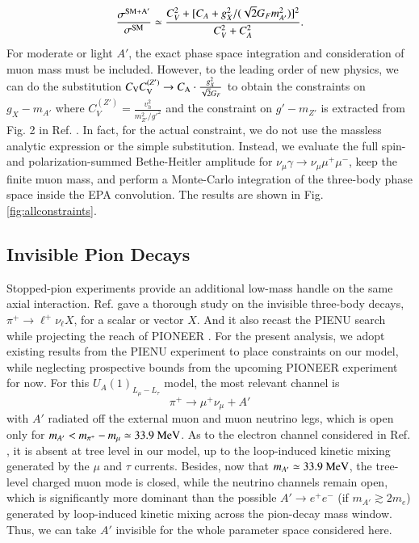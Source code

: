 \documentclass[onecolumn, aps, nofootinbib, prd, preprint, floats, floatfix, amsmath, amssymb, superscriptaddress, preprintnumbers]{revtex4-1}
\begin{document}
\begin{equation}
    \frac{\sigma^{\rm SM+A'}}{\sigma^{\rm SM}}\simeq\frac{C_V^2+[C_A+g_X^2/(\sqrt{2}G_F m_{A'}^2)]^2}{C_V^2+C_A^2}.
\end{equation}
For moderate or light $A'$, the exact phase space integration and consideration of muon mass must be included. However, to the leading order of new physics, we can do the substitution $C_{\rm V} C_{\rm V}^{(Z')}\to C_{\rm A}\cdot \frac{g_X^2}{\sqrt2G_F}$ to obtain the constraints on $g_X-m_{A'}$ where $C_{V}^{(Z')}=\frac{v_h^2}{m_{Z'}^2/g'^2}$ and the constraint on $g'-m_{Z'}$ is extracted from Fig. 2 in Ref. \cite{Altmannshofer:2014pba}.
In fact, for the actual constraint, we do not use the massless analytic expression or the simple substitution. Instead, we evaluate the full spin- and polarization-summed Bethe-Heitler amplitude for $\nu_\mu\gamma\to\nu_\mu\mu^+\mu^-$, keep the finite muon mass, and perform a Monte-Carlo integration of the three-body phase space inside the EPA convolution. The results are shown in Fig. \ref{fig:allconstraints}.

\subsection{Invisible Pion Decays}
\label{subsec:pion-invisible}

Stopped-pion experiments provide an additional low-mass handle on the same axial interaction. Ref. \cite{Altmannshofer:2026opc} gave a thorough study on the invisible three-body decays, $\pi^+\to \ell^+\nu_\ell X$, for a scalar or vector $X$. And it also recast the PIENU search \cite{PIENU:2021clt} while projecting the reach of PIONEER \cite{PIONEER:2022yag,PIONEER:2022alm}. For the present analysis, we adopt existing results from the PIENU experiment to place constraints on our model, while neglecting prospective bounds from the upcoming PIONEER experiment for now. For this $U_A(1)_{L_\mu-L_\tau}$ model, the most relevant channel is
\begin{equation}
    \pi^+\to \mu^+ \nu_\mu +A'
\end{equation}
with $A'$ radiated off the external muon and muon neutrino legs, which is open only for $m_{A'}<m_{\pi^+}-m_\mu\simeq33.9~{\rm MeV}$. As to the electron channel considered in Ref. \cite{Altmannshofer:2026opc}, it is absent at tree level in our model, up to the loop-induced kinetic mixing generated by the $\mu$ and $\tau$ currents. Besides, now that $m_{A'}\simeq33.9~{\rm MeV}$, the tree-level charged muon mode is closed, while the neutrino channels remain open, which is significantly more dominant than the possible $A'\to e^+e^-$ (if $m_{A'}\gtrsim 2m_e$) generated by loop-induced kinetic mixing across the pion-decay mass window. Thus, we can take $A'$ invisible for the whole parameter space considered here.
\end{document}
